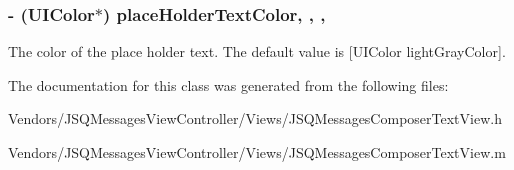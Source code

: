 \subsubsection[{place\+Holder\+Text\+Color}]{\setlength{\rightskip}{0pt plus 5cm}-\/ (U\+I\+Color$\ast$) place\+Holder\+Text\+Color\hspace{0.3cm}{\ttfamily [read]}, {\ttfamily [write]}, {\ttfamily [nonatomic]}, {\ttfamily [strong]}}\label{interface_j_s_q_messages_composer_text_view_a63dabb1df78dbe16a7a1dc4e5cea1028}
The color of the place holder text. The default value is {\ttfamily \mbox{[}U\+I\+Color light\+Gray\+Color\mbox{]}}. 

The documentation for this class was generated from the following files\+:\begin{DoxyCompactItemize}
\item 
Vendors/\+J\+S\+Q\+Messages\+View\+Controller/\+Views/J\+S\+Q\+Messages\+Composer\+Text\+View.\+h\item 
Vendors/\+J\+S\+Q\+Messages\+View\+Controller/\+Views/J\+S\+Q\+Messages\+Composer\+Text\+View.\+m\end{DoxyCompactItemize}
